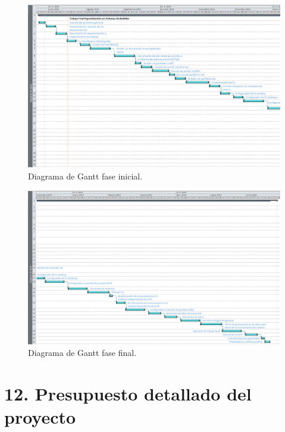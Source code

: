 \documentclass[
11pt, %
]{charter}
\begin{document}
\begin{figure}[h]
\centering 
\includegraphics[angle=90, height=0.98\textheight]{./Figuras/Gantt-real_part1.png}
\caption{Diagrama de Gantt fase inicial.}
\label{fig:diagGantt_faseinicial}
\end{figure}

\begin{figure}[h]
\centering 
\includegraphics[angle=90, height=0.98\textheight]{./Figuras/Gantt-real_part2.png}
\caption{Diagrama de Gantt fase final.}
\label{fig:diagGantt_fasefinal}
\end{figure}

\clearpage

\section{12. Presupuesto detallado del proyecto}
\label{sec:presupuesto}
\end{document}
